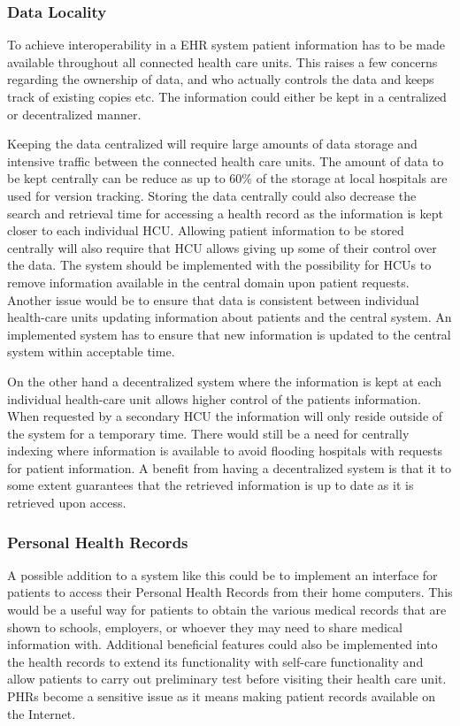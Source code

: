 \documentclass[14pt]{article}
\begin{document}
\subsubsection{Data Locality}


To achieve interoperability in a \gls{EHR} system patient information has to be made available throughout all connected health care units. This raises a few concerns regarding the ownership of data, and who actually controls the data and keeps track of existing copies etc. The information could either be kept in a centralized or decentralized manner.

Keeping the data centralized will require large amounts of data storage and intensive traffic between the connected health care units. The amount of data to be kept centrally can be reduce as up to 60\% of the storage at local hospitals are used for version tracking. Storing the data centrally could also decrease the search and retrieval time for accessing a health record as the information is kept closer to each individual \gls{HCU}.
Allowing patient information to be stored centrally will also require that \gls{HCU} allows giving up some of their control over the data. The system should be implemented with the possibility for \glspl{HCU} to remove information available in the central domain upon patient requests. Another issue would be to ensure that data is consistent between individual health-care units updating information about patients and the central system. An implemented system has to ensure that new information is updated to the central system within acceptable time.

On the other hand a decentralized system where the information is kept at each individual health-care unit allows higher control of the patients information. When requested by a secondary \gls{HCU} the information will only reside outside of the system for a temporary time. There would still be a need for centrally indexing where information is available to avoid flooding hospitals with requests for patient information. A benefit from having a decentralized system is that it to some extent guarantees that the retrieved information is up to date as it is retrieved upon access.

\subsubsection{Personal Health Records}
A possible addition to a system like this could be to implement an interface for patients to access their Personal Health Records from their home computers. This would be a useful way for patients to obtain the various medical records that are shown to schools, employers, or whoever they may need to share medical information with. Additional beneficial features could also be implemented into the health records to extend its functionality with self-care functionality and allow patients to carry out preliminary test before visiting their health care unit. \glspl{PHR} become a sensitive issue as it means making patient records available on the Internet.
\end{document}
